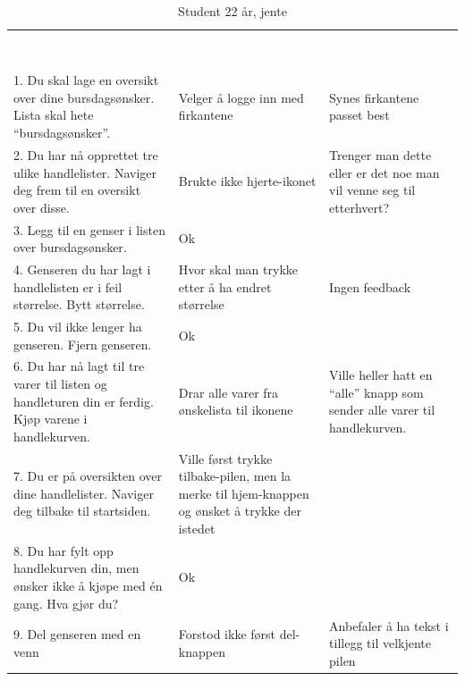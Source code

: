 \begin{table}[H]
    \caption{Student 22 år, jente}
    \label{tab:observasjon2_3}
    \centering
    \begin{tabular}{|L{15em}  L{15em} L{15em}|}
    \hline
        \textbf{\textcolor{white}{Task}} & \textbf{\textcolor{white}{Obeservation during execution}} & \textbf{\textcolor{white}{Conversation and discussion}}\\
        1. Du skal lage en oversikt over dine bursdagsønsker. Lista skal hete “bursdagsønsker”. & Velger å logge inn med firkantene & Synes firkantene passet best\\
        2. Du har nå opprettet tre ulike handlelister. Naviger deg frem til en oversikt over disse. & Brukte ikke hjerte-ikonet & Trenger man dette eller er det noe man vil venne seg til etterhvert? \\
        3. Legg til en genser i listen over bursdagsønsker. & Ok & \\ 
        4. Genseren du har lagt i handlelisten er i feil størrelse. Bytt størrelse. & Hvor skal man trykke etter å ha endret størrelse & Ingen feedback\\
        5. Du vil ikke lenger ha genseren. Fjern genseren. & Ok & \\
        6. Du har nå lagt til tre varer til listen og handleturen din er ferdig. Kjøp varene i handlekurven. & Drar alle varer fra ønskelista til ikonene & Ville heller hatt en “alle” knapp som sender alle varer til handlekurven.\\
        7. Du er på oversikten over dine handlelister. Naviger deg tilbake til startsiden. & Ville først trykke tilbake-pilen, men la merke til hjem-knappen og ønsket å trykke der istedet & \\
        8. Du har fylt opp handlekurven din, men ønsker ikke å kjøpe med én gang. Hva gjør du? & Ok & \\
        9. Del genseren med en venn & Forstod ikke først del-knappen & Anbefaler å ha tekst i tillegg til velkjente pilen\\
        \hline
    \end{tabular}
\end{table}

